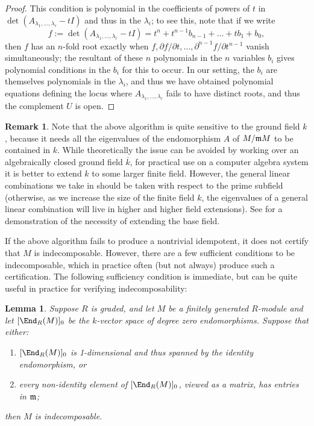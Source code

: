 \documentclass[12pt]{article}
\let\l\lambda
\let\bar\overline
\let\d\partial
\theoremstyle{theorem}
\numberwithin{thm}{section}
\newtheorem{lem}[thm]{Lemma}
\theoremstyle{definition}
\newtheorem{rem}[thm]{Remark}
\begin{document}
\begin{proof}
  This condition is polynomial in the coefficients of powers of $t$ in $\det(A_{\l_1,\dots,\l_r}-t I)$ and thus in the $\l_i$; to see this, note that
  if we write
  $$ f:=\det(A_{\l_1,\dots,\l_r}-t I)=t^n  +t^{n-1}b_{n-1}+\dots +t b_1 +b_0, $$
  then $f$
  has an $n$-fold root exactly when
  $ f,\d f/\d t,\dots, \d^{n-1} f/\d t^{n-1} $
  vanish simultaneously; the resultant of these $n$ polynomials in the $n$ variables $b_i$ gives polynomial conditions in the $b_i$ for this to occur.
  In our setting, the $b_i$ are themselves polynomials in the $\l_i$, and thus we have obtained polynomial equations defining the locus where $A_{\l_1,\dots,\l_r}$ fails to have distinct roots, and thus the complement $U$ is open.
\end{proof}


\begin{rem}
  Note that the above algorithm is quite sensitive to the ground field $k$, because it needs all the eigenvalues of the endomorphism $A$ of $M/\mathfrak m M$ to be contained in $k$. While theoretically the issue can be avoided by working over an algebraically closed ground field $\bar k$, for practical use on a computer algebra system it is better to extend $k$ to some larger finite field. However, the general linear combinations we take in  should be taken with respect to the prime subfield (otherwise, as we increase the size of the finite field $k$, the eigenvalues of a general linear combination will live in higher and higher field extensions).
  See  for a demonstration of the necessity of extending the base field.
\end{rem}

If the above algorithm fails to produce a nontrivial idempotent, it does not certify that $M$ is indecomposable. However, there are a few sufficient conditions to be indecomposable, which in practice often (but not always) produce such a certification.
The following sufficiency condition is immediate, but can be quite useful in practice for verifying indecomposability:

\begin{lem}
  Suppose $R$ is graded, and let $M$ be a finitely generated $R$-module and let $[\End_R(M)]_0$ be the $k$-vector space of degree zero endomorphisms. Suppose that either:
  \begin{enumerate}
  \item $[\End_R(M)]_0$ is 1-dimensional and thus spanned by the identity endomorphism, or
  \item every non-identity element of $[\End_R(M)]_0$, viewed as a matrix, has entries in $\mathfrak m$;
  \end{enumerate}
  then $M$ is indecomposable.
\end{lem}
\end{document}
